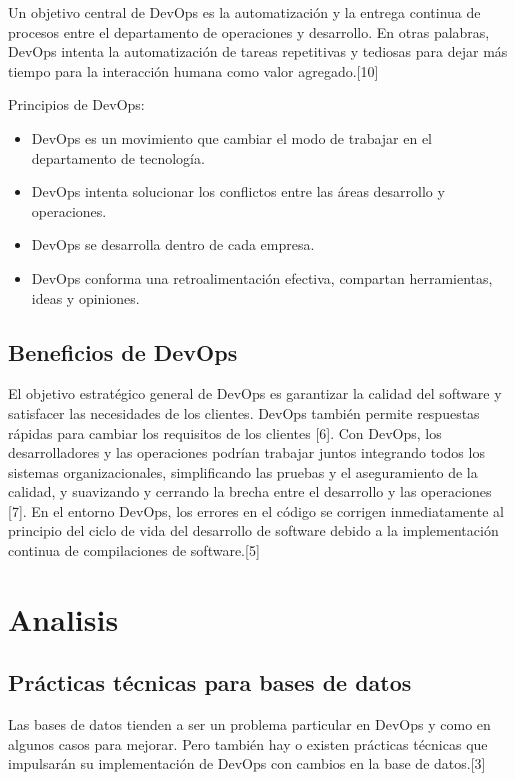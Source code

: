 \documentclass[twoside,twocolumn]{article}
\begin{document}
Un objetivo central de DevOps es la automatización y la entrega continua de procesos entre el departamento de operaciones y desarrollo. En otras palabras, DevOps intenta la automatización de tareas repetitivas y tediosas para dejar más tiempo para la interacción humana como valor agregado.[10]

Principios de DevOps:

\begin{itemize}
\item DevOps es un movimiento que cambiar el modo de trabajar en el departamento de tecnología.
\item DevOps intenta solucionar los conflictos entre las áreas desarrollo y operaciones.
\item DevOps se desarrolla dentro de cada empresa.
\item DevOps conforma una retroalimentación efectiva, compartan herramientas, ideas y opiniones.

\end{itemize}


\subsection{Beneficios de DevOps}

El objetivo estratégico general de DevOps es garantizar la calidad del software y satisfacer las necesidades de los clientes. DevOps también permite respuestas rápidas para cambiar los requisitos de los clientes [6]. Con DevOps, los desarrolladores y las operaciones podrían trabajar juntos integrando todos los sistemas organizacionales, simplificando las pruebas y el aseguramiento de la calidad, y suavizando y cerrando la brecha entre el desarrollo y las operaciones [7]. En el entorno DevOps, los errores en el código se corrigen inmediatamente al principio del ciclo de vida del desarrollo de software debido a la implementación continua de compilaciones de software.[5]




\section{Analisis}

\subsection{Prácticas técnicas para bases de datos}
Las bases de datos tienden a ser un problema particular en DevOps y como en algunos casos para mejorar.
Pero también hay o existen prácticas técnicas que impulsarán su implementación de DevOps con cambios en la base de datos.[3]
\end{document}
